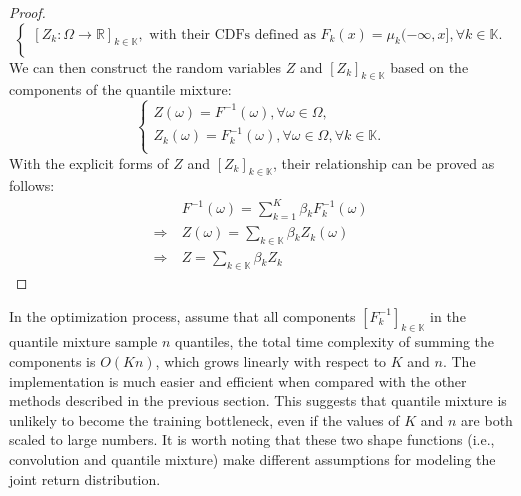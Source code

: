 \documentclass[twoside,11pt]{article}
\newcommand{\agentspace}{\mathbb{K}}
\newcommand{\agentcounter}{k}
\newcommand{\numberofagents}{K}
\newcommand{\utility}{Z}
\newcommand{\quantilefunction}{F^{-1}}
\newcommand{\quantile}{\omega}
\newcommand{\modelparameter}{\beta}
\begin{document}
\begin{proof}
\begin{equation*}
\begin{cases}
[Z_k:\Omega\rightarrow\mathbb{R}]_{\agentcounter\in\agentspace}, \text{ with their CDFs defined as $F_k(x)=\mu_k(-\infty,x], \forall \agentcounter\in\agentspace$}.\\
\end{cases}
\end{equation*}
We can then construct the random variables $Z$ and $[\utility_{\agentcounter{}}]_{\agentcounter{}\in\agentspace{}}$ based on the components of the quantile mixture:
\begin{equation*}
\begin{cases}
\utility(\quantile)=\quantilefunction(\quantile), \forall \quantile\in\Omega, \\
\utility_\agentcounter{}(\quantile)=\quantilefunction_{\agentcounter{}}(\quantile), \forall \quantile\in\Omega, \forall \agentcounter\in\agentspace. \\
\end{cases}
\end{equation*}
\begin{equation*}
\end{equation*}
With the explicit forms of $Z$ and $[Z_k]_{\agentcounter\in\agentspace}$, their relationship can be proved as follows:
\begin{align*}
& \quantilefunction(\quantile{})=\sum^{\numberofagents{}}_{k=1}\modelparameter{}_{\agentcounter{}} \quantilefunction_{\agentcounter{}}(\quantile{}) \\
\Rightarrow\ & Z(\quantile)=\sum_{\agentcounter\in\agentspace}\modelparameter{}_{\agentcounter{}}\utility_{\agentcounter{}}(\quantile) \\
\Rightarrow\ & Z=\sum_{\agentcounter\in\agentspace}\modelparameter{}_{\agentcounter{}}\utility_{\agentcounter{}}
\end{align*}
\end{proof} In the optimization process, assume that all components $[\quantilefunction_{\agentcounter{}}]_{\agentcounter{}\in\agentspace{}}$ in the quantile mixture sample $n$ quantiles, the total time complexity of summing the components is $O(\numberofagents{}n)$, which grows linearly with respect to $\numberofagents{}$ and $n$. The implementation is much easier and efficient when compared with the other methods described in the previous section. This suggests that quantile mixture is unlikely to become the training bottleneck, even if the values of $\numberofagents{}$ and $n$ are both scaled to large numbers. It is worth noting that these two shape functions (i.e., convolution and quantile mixture) make different assumptions for modeling the joint return distribution.
\end{document}
